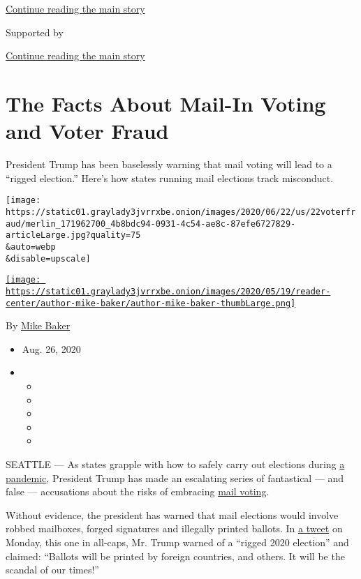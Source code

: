 \protect\hyperlink{after-top}{Continue reading the main story}

Supported by

\protect\hyperlink{after-sponsor}{Continue reading the main story}

\hypertarget{the-facts-about-mail-in-voting-and-voter-fraud}{%
\section{The Facts About Mail-In Voting and Voter
Fraud}\label{the-facts-about-mail-in-voting-and-voter-fraud}}

President Trump has been baselessly warning that mail voting will lead
to a ``rigged election.'' Here's how states running mail elections track
misconduct.

\texttt{[image: https://static01.graylady3jvrrxbe.onion/images/2020/06/22/us/22voterfraud/merlin\_171962700\_4b8bdc94-0931-4c54-ae8c-87efe6727829-articleLarge.jpg?quality=75\\\&auto=webp\\\&disable=upscale]}

\href{https://www.nytimes3xbfgragh.onion/by/mike-baker}{\texttt{[image: https://static01.graylady3jvrrxbe.onion/images/2020/05/19/reader-center/author-mike-baker/author-mike-baker-thumbLarge.png]}}

By \href{https://www.nytimes3xbfgragh.onion/by/mike-baker}{Mike Baker}

\begin{itemize}
\item
  Aug. 26, 2020
\item
  \begin{itemize}
  \item
  \item
  \item
  \item
  \item
  \end{itemize}
\end{itemize}

SEATTLE --- As states grapple with how to safely carry out elections
during
\href{https://www.nytimes3xbfgragh.onion/news-event/coronavirus}{a
pandemic}, President Trump has made an escalating series of fantastical
--- and false --- accusations about the risks of embracing
\href{https://www.nytimes3xbfgragh.onion/2020/08/26/us/politics/mail-in-voting-foreign-intervention.html}{mail
voting}.

Without evidence, the president has warned that mail elections would
involve robbed mailboxes, forged signatures and illegally printed
ballots. In
\href{https://twitter.com/realDonaldTrump/status/1275024974579982336}{a
tweet} on Monday, this one in all-caps, Mr. Trump warned of a ``rigged
2020 election'' and claimed: ``Ballots will be printed by foreign
countries, and others. It will be the scandal of our times!''

